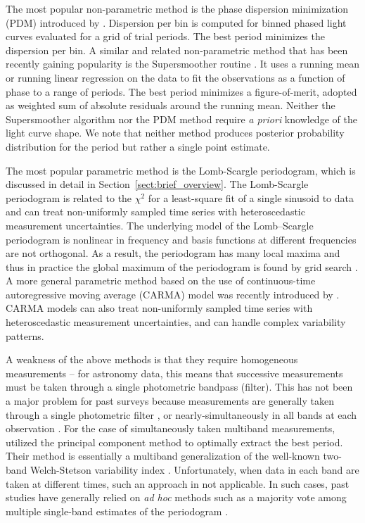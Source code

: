 \documentclass{emulateapj}
\newcommand{\foreign}[1]{{\it #1}}
\newcommand{\apriori}{\foreign{a priori}}
\newcommand{\adhoc}{\foreign{ad hoc}}
\newcommand{\Sect}[1]{Section~\ref{sect:#1}}
\newcommand{\sect}[1]{\Sect{#1}}
\begin{document}
The most popular non-parametric method is the phase dispersion minimization (PDM) introduced by \cite{PDM1978}. 
Dispersion per bin is computed for binned phased light curves evaluated for a grid of trial periods. The best
period minimizes the dispersion per bin.  A similar and related non-parametric method that has been recently 
gaining popularity is the Supersmoother routine \citep{Reimann94}. It uses a running mean or running linear 
regression on the data to fit the observations as a function of phase to a range of periods. The best period 
minimizes a figure-of-merit, adopted as weighted sum of absolute residuals around the running mean. 
Neither the Supersmoother algorithm nor the PDM method require \apriori{} knowledge of the light curve shape. 
We note that neither method produces posterior probability distribution for the period but rather a single point 
estimate. 

The most popular parametric method is the Lomb-Scargle periodogram, which is discussed in detail in \sect{brief_overview}.
The Lomb-Scargle periodogram is related to the $\chi^2$ for a least-square fit of a single sinusoid to data
and can treat non-uniformly sampled time series with heteroscedastic measurement uncertainties. 
The underlying model of the Lomb–Scargle periodogram is nonlinear in frequency and basis functions at different
frequencies are not orthogonal. As a result, the periodogram has many local maxima and thus in practice the global 
maximum of the periodogram is found by grid search \citep[for details see, e.g.][]{ICVG2014}.
A more general parametric method based on the use of continuous-time autoregressive moving average (CARMA) model
was recently introduced by \citet{Kelly14}. CARMA models can also treat non-uniformly sampled time series with 
heteroscedastic measurement uncertainties, and can handle complex variability patterns. 

A weakness of the above methods is that they require homogeneous measurements -- for astronomy data, this means 
that successive measurements must be taken through a single photometric bandpass (filter). This has not been a major
problem for past surveys because measurements are generally taken through a single photometric filter 
\citep [e.g. LINEAR,][]{LINEAR1}, or nearly-simultaneously in all bands at each observation \citep [e.g. SDSS,][]{Sesar2010}.
For the case of simultaneously taken multiband measurements, \cite{Suveges12} utilized the principal component
method to optimally extract the best period. Their method is essentially a multiband generalization of the well-known
two-band Welch-Stetson variability index \citep{WelchStetson1993}. Unfortunately, when data in each band are taken at
different times, such an approach in not applicable. In such cases, past studies have generally relied 
on \adhoc{} methods such as a majority vote among multiple single-band estimates of the 
periodogram \citep[e.g.,][]{Oluseyi12}. 
\end{document}
